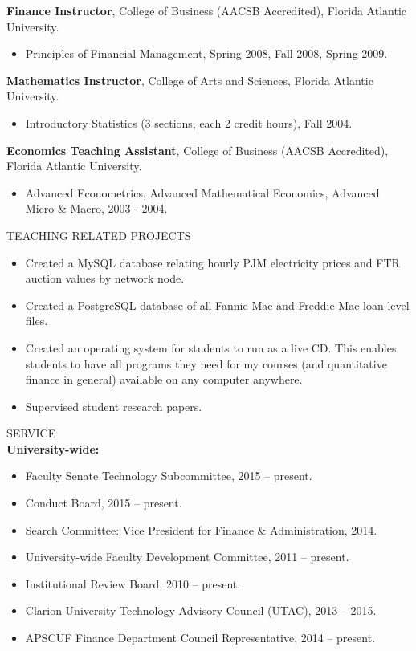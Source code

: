 \documentclass[9pt]{article}
\begin{document}
{\bf Finance Instructor}, College of Business (AACSB Accredited), Florida Atlantic University.
\begin{itemize}[noitemsep, nolistsep]
\item Principles of Financial Management, Spring 2008, Fall 2008, Spring 2009.
\end{itemize}
{\bf Mathematics Instructor}, College of Arts and Sciences, Florida Atlantic University.
\begin{itemize}[noitemsep, nolistsep]
\item Introductory Statistics (3 sections, each 2 credit hours), Fall 2004.
\end{itemize}
{\bf Economics Teaching Assistant}, College of Business (AACSB Accredited), Florida Atlantic University.
\begin{itemize}[noitemsep, nolistsep]
\item Advanced Econometrics, Advanced Mathematical Economics, Advanced Micro \& Macro, 2003 - 2004.
\end{itemize}
\vspace{10pt}
TEACHING RELATED PROJECTS
\begin{itemize}[noitemsep, nolistsep]
\item Created a MySQL database relating hourly PJM electricity prices and FTR auction values by network node.
\item Created a PostgreSQL database of all Fannie Mae and Freddie Mac loan-level files.
\item Created an operating system for students to run as a live CD. This enables students to have all programs they need for my courses (and quantitative finance in general) available on any computer anywhere.
\item Supervised student research papers.
\end{itemize}
\vspace{10pt}
SERVICE \\
{\bf University-wide:}
\begin{itemize}[noitemsep, nolistsep]
\item Faculty Senate Technology Subcommittee, 2015 -- present.
\item Conduct Board, 2015 -- present.
\item Search Committee: Vice President for Finance \& Administration, 2014.
\item University-wide Faculty Development Committee, 2011 -- present.
\item Institutional Review Board, 2010 -- present. 
\item Clarion University Technology Advisory Council (UTAC), 2013 -- 2015. 
\item APSCUF Finance Department Council Representative, 2014 -- present. 
\end{itemize}
\end{document}
